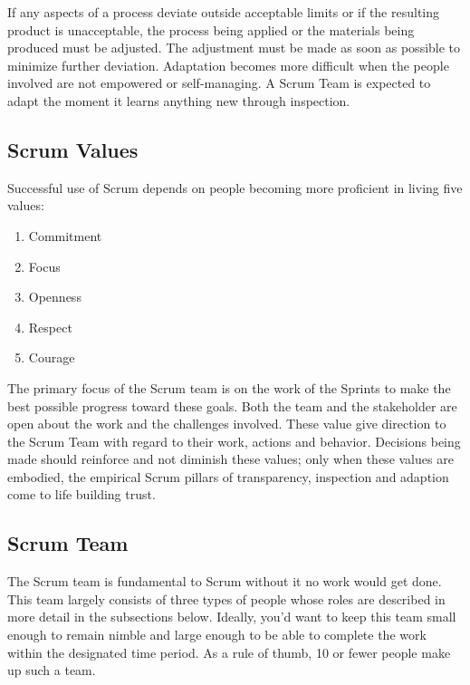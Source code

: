 \begin{flushleft}
	If any aspects of a process deviate outside acceptable limits or if the resulting
	product is unacceptable, the process being applied or the materials being produced
	must be adjusted. The adjustment must be made as soon as possible to minimize
	further deviation. Adaptation becomes more difficult when the people involved are
	not empowered or self-managing. A Scrum Team is expected to adapt the moment it
	learns anything new through inspection.
\end{flushleft}

\subsection{Scrum Values}\label{scrum-values}

\begin{flushleft}
	Successful use of Scrum depends on people becoming more proficient in living five values:
\end{flushleft}

\begin{enumerate}
	\item Commitment
	\item Focus
	\item Openness
	\item Respect
	\item Courage
\end{enumerate}

\begin{flushleft}
	The primary focus of the Scrum team is on the work of the Sprints to make the
	best possible progress toward these goals. Both the team and the stakeholder
	are open about the work and the challenges involved. These value give direction
	to the Scrum Team with regard to their work, actions and behavior. Decisions
	being made should reinforce and not diminish these values; only when these
	values are embodied, the empirical Scrum pillars of transparency, inspection
	and adaption come to life building trust.
\end{flushleft}

\subsection{Scrum Team}\label{scrum-team}

\begin{flushleft}
	The Scrum team is fundamental to Scrum without it no work would get done.
	This team largely consists of three types of people whose roles are described
	in more detail in the subsections below. Ideally, you'd want to keep this
	team small enough to remain nimble and large enough to be able to complete the
	work within the designated time period. As a rule of thumb, 10 or fewer people
	make up such a team.
\end{flushleft}

